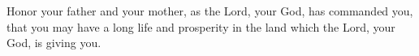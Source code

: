 
\lettrine{H}{}onor your father and your mother, as the Lord, your God, has commanded you, that you may have a long life and prosperity in the land which the Lord, your God, is giving you.
